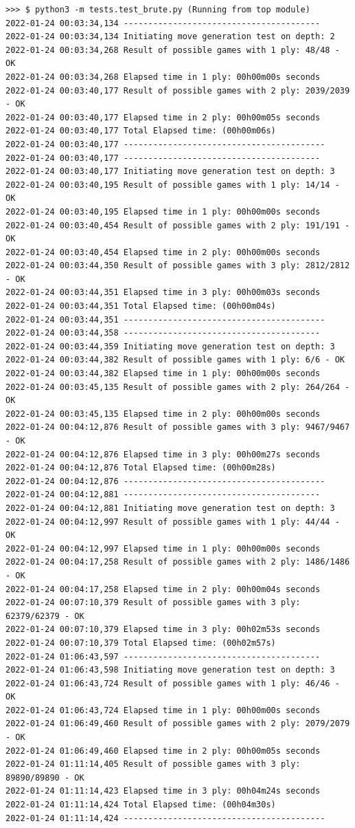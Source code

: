 \documentclass[10pt]{article}
\begin{document}
\begin{lstlisting}
>>> $ python3 -m tests.test_brute.py (Running from top module)
2022-01-24 00:03:34,134 ----------------------------------------
2022-01-24 00:03:34,134 Initiating move generation test on depth: 2
2022-01-24 00:03:34,268 Result of possible games with 1 ply: 48/48 - OK
2022-01-24 00:03:34,268 Elapsed time in 1 ply: 00h00m00s seconds
2022-01-24 00:03:40,177 Result of possible games with 2 ply: 2039/2039 - OK
2022-01-24 00:03:40,177 Elapsed time in 2 ply: 00h00m05s seconds
2022-01-24 00:03:40,177 Total Elapsed time: (00h00m06s)
2022-01-24 00:03:40,177 -----------------------------------------
2022-01-24 00:03:40,177 ----------------------------------------
2022-01-24 00:03:40,177 Initiating move generation test on depth: 3
2022-01-24 00:03:40,195 Result of possible games with 1 ply: 14/14 - OK
2022-01-24 00:03:40,195 Elapsed time in 1 ply: 00h00m00s seconds
2022-01-24 00:03:40,454 Result of possible games with 2 ply: 191/191 - OK
2022-01-24 00:03:40,454 Elapsed time in 2 ply: 00h00m00s seconds
2022-01-24 00:03:44,350 Result of possible games with 3 ply: 2812/2812 - OK
2022-01-24 00:03:44,351 Elapsed time in 3 ply: 00h00m03s seconds
2022-01-24 00:03:44,351 Total Elapsed time: (00h00m04s)
2022-01-24 00:03:44,351 -----------------------------------------
2022-01-24 00:03:44,358 ----------------------------------------
2022-01-24 00:03:44,359 Initiating move generation test on depth: 3
2022-01-24 00:03:44,382 Result of possible games with 1 ply: 6/6 - OK
2022-01-24 00:03:44,382 Elapsed time in 1 ply: 00h00m00s seconds
2022-01-24 00:03:45,135 Result of possible games with 2 ply: 264/264 - OK
2022-01-24 00:03:45,135 Elapsed time in 2 ply: 00h00m00s seconds
2022-01-24 00:04:12,876 Result of possible games with 3 ply: 9467/9467 - OK
2022-01-24 00:04:12,876 Elapsed time in 3 ply: 00h00m27s seconds
2022-01-24 00:04:12,876 Total Elapsed time: (00h00m28s)
2022-01-24 00:04:12,876 -----------------------------------------
2022-01-24 00:04:12,881 ----------------------------------------
2022-01-24 00:04:12,881 Initiating move generation test on depth: 3
2022-01-24 00:04:12,997 Result of possible games with 1 ply: 44/44 - OK
2022-01-24 00:04:12,997 Elapsed time in 1 ply: 00h00m00s seconds
2022-01-24 00:04:17,258 Result of possible games with 2 ply: 1486/1486 - OK
2022-01-24 00:04:17,258 Elapsed time in 2 ply: 00h00m04s seconds
2022-01-24 00:07:10,379 Result of possible games with 3 ply: 62379/62379 - OK
2022-01-24 00:07:10,379 Elapsed time in 3 ply: 00h02m53s seconds
2022-01-24 00:07:10,379 Total Elapsed time: (00h02m57s)
2022-01-24 01:06:43,597 ----------------------------------------
2022-01-24 01:06:43,598 Initiating move generation test on depth: 3
2022-01-24 01:06:43,724 Result of possible games with 1 ply: 46/46 - OK
2022-01-24 01:06:43,724 Elapsed time in 1 ply: 00h00m00s seconds
2022-01-24 01:06:49,460 Result of possible games with 2 ply: 2079/2079 - OK
2022-01-24 01:06:49,460 Elapsed time in 2 ply: 00h00m05s seconds
2022-01-24 01:11:14,405 Result of possible games with 3 ply: 89890/89890 - OK
2022-01-24 01:11:14,423 Elapsed time in 3 ply: 00h04m24s seconds
2022-01-24 01:11:14,424 Total Elapsed time: (00h04m30s)
2022-01-24 01:11:14,424 -----------------------------------------
    

\end{lstlisting}
\end{document}
